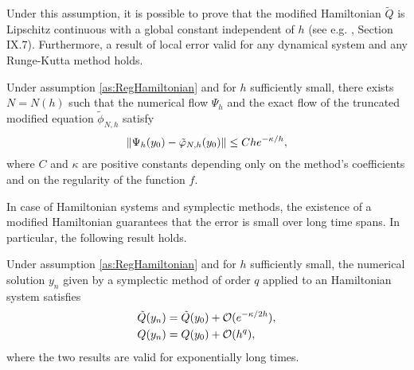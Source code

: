 \documentclass[10pt]{article}
\begin{document}
Under this assumption, it is possible to prove that the modified Hamiltonian $\tilde Q$ is Lipschitz continuous with a global constant independent of $h$ (see e.g. \cite{HLW06}, Section IX.7). Furthermore, a result of local error valid for any dynamical system and any Runge-Kutta method holds.

\begin{lemma}\label{lem:LocalHamiltonianDet} Under assumption \ref{as:RegHamiltonian} and for $h$ sufficiently small, there exists $N = N(h)$ such that the numerical flow $\Psi_h$ and the exact flow of the truncated modified equation $\tilde \phi_{N, h}$ satisfy
	\begin{equation}
	\lVert\Psi_h(y_0) - \tilde {\varphi}_{N, h}(y_0)\rVert \leq C h e^{-\kappa / h},
	\end{equation}
	where $C$ and $\kappa$ are positive constants depending only on the method's coefficients and on the regularity of the function $f$.
\end{lemma}

In case of Hamiltonian systems and symplectic methods, the existence of a modified Hamiltonian guarantees that the error is small over long time spans. In particular, the following result holds.

\begin{theorem} Under assumption \ref{as:RegHamiltonian} and for $h$ sufficiently small, the numerical solution $y_n$ given by a symplectic method of order $q$ applied to an Hamiltonian system satisfies
	\begin{align}
		\tilde Q(y_n) &= \tilde Q (y_0) + \mathcal{O}(e^{-\kappa / 2h}), \\
		Q(y_n) &= Q(y_0) + \mathcal{O}(h^q),
	\end{align}
	where the two results are valid for exponentially long times.
\end{theorem}
\end{document}
